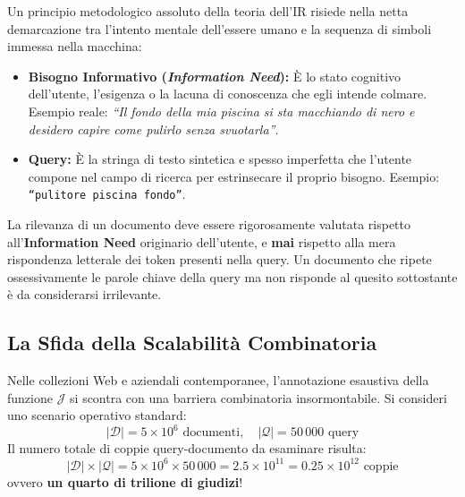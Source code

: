 Un principio metodologico assoluto della teoria dell'IR risiede nella netta demarcazione tra l'intento mentale dell'essere umano e la sequenza di simboli immessa nella macchina:

\begin{itemize}
    \item \textbf{Bisogno Informativo (\textit{Information Need}):} \`E lo stato cognitivo dell'utente, l'esigenza o la lacuna di conoscenza che egli intende colmare. Esempio reale: \textit{``Il fondo della mia piscina si sta macchiando di nero e desidero capire come pulirlo senza svuotarla''}.
    \item \textbf{Query:} \`E la stringa di testo sintetica e spesso imperfetta che l'utente compone nel campo di ricerca per estrinsecare il proprio bisogno. Esempio: \texttt{``pulitore piscina fondo''}.
\end{itemize}

\begin{property}
La rilevanza di un documento deve essere rigorosamente valutata rispetto all'\textbf{Information Need} originario dell'utente, e \textbf{mai} rispetto alla mera rispondenza letterale dei token presenti nella query. Un documento che ripete ossessivamente le parole chiave della query ma non risponde al quesito sottostante \`e da considerarsi irrilevante.
\end{property}

\FloatBarrier
\subsection{La Sfida della Scalabilit\`a Combinatoria}
\label{subsec:scalabilita-combinatoria}

Nelle collezioni Web e aziendali contemporanee, l'annotazione esaustiva della funzione $\mathcal{J}$ si scontra con una barriera combinatoria insormontabile. Si consideri uno scenario operativo standard:
\begin{equation}
|\mathcal{D}| = 5 \times 10^6 \text{ documenti}, \quad |\mathcal{Q}| = 50\,000 \text{ query}
\end{equation}
Il numero totale di coppie query-documento da esaminare risulta:
\begin{equation}
|\mathcal{D}| \times |\mathcal{Q}| = 5 \times 10^6 \times 50\,000 = 2.5 \times 10^{11} = 0.25 \times 10^{12} \text{ coppie}
\end{equation}
ovvero \textbf{un quarto di trilione di giudizi}!


